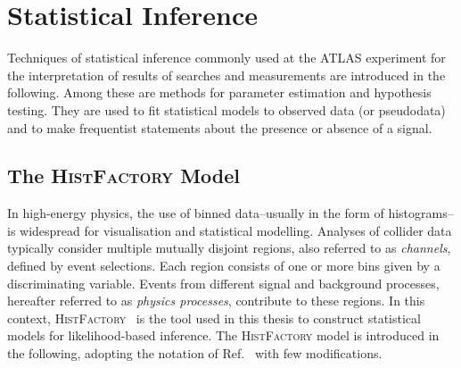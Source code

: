 \section{Statistical Inference}%
\label{sec:statistical_inference}

Techniques of statistical inference commonly used at the ATLAS experiment for
the interpretation of results of searches and measurements are introduced in the
following. Among these are methods for parameter estimation and hypothesis
testing. They are used to fit statistical models to observed data (or
pseudodata) and to make frequentist statements about the presence or absence of
a signal.


\subsection{The \textsc{HistFactory} Model}%
\label{sec:histfactory}

In high-energy physics, the use of binned data--usually in the form of
histograms--is widespread for visualisation and statistical modelling. Analyses
of collider data typically consider multiple mutually disjoint regions, also
referred to as \emph{channels}, defined by event selections. Each region
consists of one or more bins given by a discriminating variable. Events from
different signal and background processes, hereafter referred to as
\emph{physics processes}, contribute to these regions. In this context,
\textsc{HistFactory}~\cite{cranmer2012} is the tool used in this thesis to
construct statistical models for likelihood-based inference. The
\textsc{HistFactory} model is introduced in the following, adopting the notation
of Ref.~\cite{cranmer2012} with few modifications.

